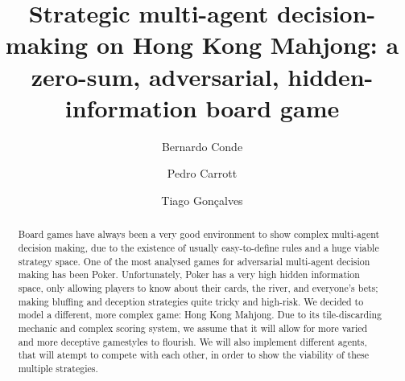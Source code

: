 \documentclass{acmart}
\begin{document}
\title{Strategic multi-agent decision-making on Hong Kong Mahjong: a zero-sum, adversarial, hidden-information board game}

\author{Bernardo Conde}
\author{Pedro Carrott}
\author{Tiago Gonçalves}

\renewcommand{\shortauthors}{Conde, Carrott and Gonçalves}

\begin{abstract}
  Board games have always been a very good environment to show complex multi-agent decision making, due to the existence of usually easy-to-define rules
  and a huge viable strategy space. One of the most analysed games for adversarial multi-agent decision making has been Poker.
  Unfortunately, Poker has a very high hidden information space, only allowing players to know about their cards, the river, and everyone's bets;
  making bluffing and deception strategies quite tricky and high-risk.
  We decided to model a different, more complex game: Hong Kong Mahjong. Due to its tile-discarding mechanic and complex scoring system\cite{hkmahjongrules},
  we assume that it will allow for more varied and more deceptive gamestyles to flourish. We will also implement different agents, that will atempt to compete
  with each other, in order to show the viability of these multiple strategies.
\end{abstract}


\maketitle
\end{document}
